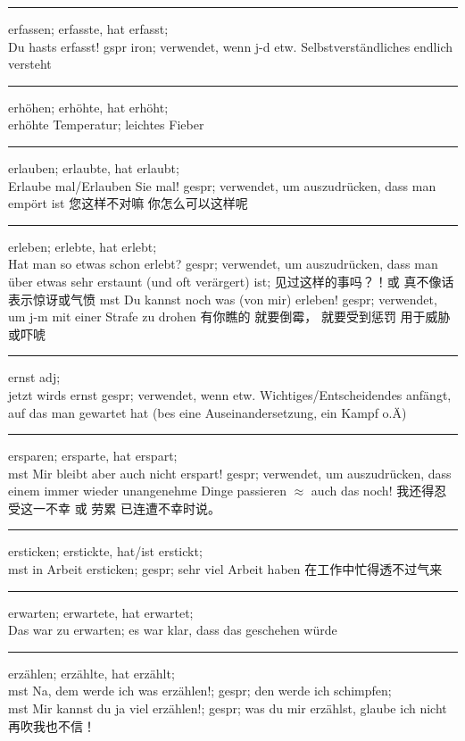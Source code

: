 \noindent\rule{\textwidth}{1pt}
erfassen; erfasste, hat erfasst;\\
Du hasts erfasst! gspr iron; verwendet, wenn j-d etw. Selbstverst\"andliches endlich versteht \\

\noindent\rule{\textwidth}{1pt}
erh\"ohen; erh\"ohte, hat erh\"oht;\\
erh\"ohte Temperatur; leichtes Fieber\\

\noindent\rule{\textwidth}{1pt}
erlauben; erlaubte, hat erlaubt;\\
Erlaube mal/Erlauben Sie mal! gespr; verwendet, um auszudr\"ucken, dass man emp\"ort ist 您这样不对嘛 你怎么可以这样呢\\

\noindent\rule{\textwidth}{1pt}
erleben; erlebte, hat erlebt;\\
Hat man so etwas schon erlebt? gespr; verwendet, um auszudr\"ucken, dass man \"uber etwas sehr erstaunt (und oft ver\"argert) ist; 见过这样的事吗？！或 真不像话 表示惊讶或气愤 mst Du kannst noch was (von mir) erleben! gespr; verwendet, um j-m mit einer Strafe zu drohen 有你瞧的 就要倒霉， 就要受到惩罚 用于威胁或吓唬\\

\noindent\rule{\textwidth}{1pt}
ernst adj;\\
jetzt wirds ernst gespr; verwendet, wenn etw. Wichtiges/Entscheidendes anf\"angt, auf das man gewartet hat (bes eine Auseinandersetzung, ein Kampf o.\"A)

\noindent\rule{\textwidth}{1pt}
ersparen; ersparte, hat erspart;\\
mst Mir bleibt aber auch nicht erspart! gespr; verwendet, um auszudr\"ucken, dass einem immer wieder unangenehme Dinge passieren $\approx$ auch das noch! 我还得忍受这一不幸 或 劳累 已连遭不幸时说。\\

\noindent\rule{\textwidth}{1pt}
ersticken; erstickte, hat/ist erstickt;\\
mst in Arbeit ersticken; gespr; sehr viel Arbeit haben 在工作中忙得透不过气来\\

\noindent\rule{\textwidth}{1pt}
erwarten; erwartete, hat erwartet;\\
Das war zu erwarten; es war klar, dass das geschehen w\"urde \\

\noindent\rule{\textwidth}{1pt}
erz\"ahlen; erz\"ahlte, hat erz\"ahlt;\\
mst Na, dem werde ich was erz\"ahlen!; gespr; den werde ich schimpfen;\\
mst Mir kannst du ja viel erz\"ahlen!; gespr; was du mir erz\"ahlst, glaube ich nicht 再吹我也不信！\\

